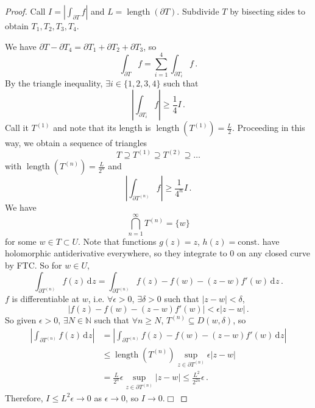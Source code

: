 \documentclass{article}
\theoremstyle{plain}\theoremheaderfont{\normalfont\itshape}\theorembodyfont{\rmfamily}\theoremseparator{.}\newtheorem*{rem}{Remark}\newtheorem*{ex}{Example}\newtheorem*{proof}{Proof}\newtheorem*{altp}{Alternative proof}\newtheorem*{con}{Consequences}\newtheorem*{notn}{Notations}\newtheorem*{cau}{Caution}\newtheorem*{term}{Terminology}\newtheorem*{keyex}{Key example}
\theoremstyle{plain}\theoremheaderfont{\normalfont\bfseries}\theorembodyfont{\rmfamily}\theoremseparator{.}\newtheorem{thm}{Theorem}[section]\newtheorem{lem}[thm]{Lemma}\newtheorem{prop}[thm]{Proposition}\newtheorem*{cor}{Corollary}\newtheorem{defn}[thm]{Definition}\newtheorem{clm}[thm]{Claim}\newtheorem{clminproof}{Claim}\newtheorem{leminproof}{Lemma}\newtheorem{app}{Application}
\theoremstyle{break}\theoremheaderfont{\normalfont\itshape}\theorembodyfont{\rmfamily}\theoremseparator{.\medskip}\newtheorem*{proofskip}{Proof}\newtheorem*{exs}{Examples}\newtheorem*{rems}{Remarks}\newtheorem*{rec}{Recall}\newtheorem*{ppts}{Properties}
\theoremstyle{break}\theoremheaderfont{\normalfont\bfseries}\theorembodyfont{\rmfamily}\theoremseparator{.\medskip}\newtheorem{lemskip}[thm]{Lemma}\newtheorem{defnskip}[thm]{Definition}\newtheorem{propskip}[thm]{Proposition}\newtheorem{thmskip}[thm]{Theorem}
\numberwithin{equation}{section}
\DeclareMathOperator*{\length}{length}
\newcommand{\qed}{\hfill\ensuremath{\Box}}
\newcommand{\abs}[1]{\left|#1\right|}
\newcommand{\dd}[2][]{\,\mathrm{d}^{#1} #2}
\newcommand{\NN}{\mathbb{N}}
\begin{document}
    \begin{proof}
        Call \(I=\abs{\int_{\partial T}f}\) and \(L=\length(\partial T)\). Subdivide \(T\) by bisecting sides to obtain \(T_1,T_2,T_3,T_4\).

        \begin{figure}[ht!]
            \centering
        \end{figure}

        We have \(\partial T-\partial T_4=\partial T_1+\partial T_2+\partial T_3\), so
        \[\int_{\partial T}f=\sum_{i=1}^{4}\int_{\partial T_i}f\,.\]
        By the triangle inequality, \(\exists i\in\{1,2,3,4\}\) such that
        \[\abs{\int_{\partial T_i}f}\ge \frac{1}{4}I\,.\]
        Call it \(T^{(1)}\) and note that its length is \(\length(T^{(1)})=\frac{L}{2}\). Proceeding in this way, we obtain a sequence of triangles
        \[ T\supseteq T^{(1)}\supseteq T^{(2)}\supseteq\dots\]
        with \(\length(T^{(n)})=\frac{L}{2^n}\) and
        \[\abs{\int_{\partial T^{(n)}}f}\ge \frac{1}{4^n}I\,.\]
        We have
        \[\bigcap_{n=1}^{\infty}T^{(n)}=\{w\}\]
        for some \(w\in T\subset U\). Note that functions \(g(z)=z\), \(h(z)=\text{const.}\) have holomorphic antiderivative everywhere, so they integrate to \(0\) on any closed curve by FTC. So for \(w\in U\),
        \[\int_{\partial T^{(n)}}f(z)\dd{z}=\int_{\partial T^{(n)}}f(z)-f(w)-(z-w)f'(w)\dd{z}\,.\]
        \(f\) is differentiable at \(w\), i.e. \(\forall\epsilon>0\), \(\exists\delta>0\) such that \(\abs{z-w}<\delta\),
        \[\abs{f(z)-f(w)-(z-w)f'(w)}<\epsilon\abs{z-w}\,.\]
        So given \(\epsilon>0\), \(\exists N\in\NN\) such that \(\forall n\ge N\), \(T^{(n)}\subseteq D(w,\delta)\), so
        \begin{align*}
            \abs{\int_{\partial T^{(n)}}f(z)\dd{z}}&=\abs{\int_{\partial T^{(n)}}f(z)-f(w)-(z-w)f'(w)\dd{z}}\\
            &\le\length(T^{(n)})\sup_{z\in\partial T^{(n)}}\epsilon\abs{z-w}\\
            &=\frac{L}{2^n}\epsilon\sup_{z\in\partial T^{(n)}}\abs{z-w}\le \frac{L^2}{2^{2n}}\epsilon\,.
        \end{align*}
        Therefore, \(I\le L^2\epsilon\to 0\) as \(\epsilon\to 0\), so \(I\to 0\).\qed
    \end{proof}
\end{document}
